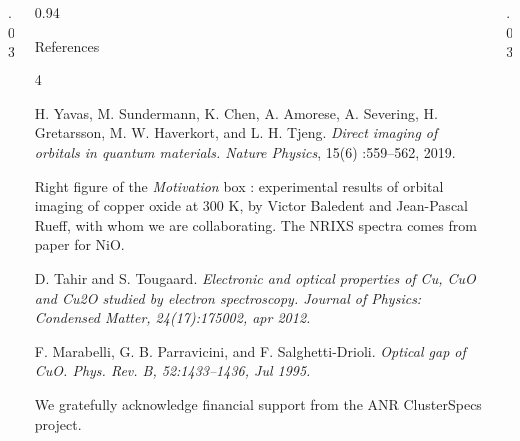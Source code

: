 \documentclass[final, hyperref={pdfpagelabels=false}]{beamer}
\begin{document}
\begin{frame}[t]
\begin{columns}[t]  %

\begin{column}{.03\textwidth}
\end{column} %

\begin{column}{0.94\textwidth}
%
\begin{block}{\color{gray!10} \normalsize References}
{\footnotesize
\begin{thebibliography}{4}

H. Yavas, M. Sundermann, K. Chen, A. Amorese, A. Severing, H. Gretarsson, M. W. Haverkort, and L. H. Tjeng. \textit{Direct imaging of orbitals in quantum materials. Nature Physics}, 15(6) :559–562, 2019.

Right figure of the \textit{Motivation} box : experimental results of orbital imaging of copper oxide at $300$ K, by Victor Baledent and Jean-Pascal Rueff, with whom we are collaborating. The NRIXS spectra comes from paper \cite{Yavas2019} for NiO.

D. Tahir and S. Tougaard. \textit{Electronic and optical properties of Cu, CuO and Cu2O studied by electron spectroscopy. Journal of Physics: Condensed Matter, 24(17):175002, apr 2012.}

F. Marabelli, G. B. Parravicini, and F. Salghetti-Drioli. \textit{Optical gap of CuO. Phys. Rev. B, 52:1433–1436, Jul 1995.}

We gratefully acknowledge financial support from the ANR ClusterSpecs project.

\end{thebibliography}
 }
\end{block}
\end{column}

\begin{column}{.03\textwidth}
\end{column} %
\end{columns}



\end{frame} %
\end{document}
